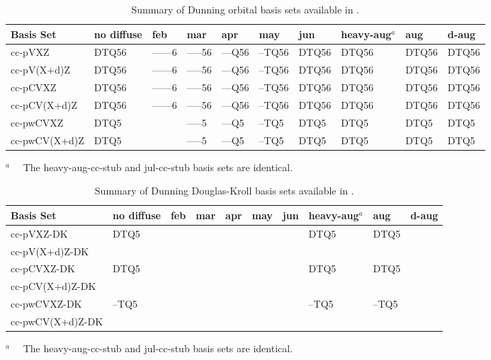\begin{table}[!htbp]
\begin{footnotesize}
\caption{Summary of Dunning orbital basis sets available in \PSIfour.} \label{table:basisDunningOrbital}
\parsep 10pt
\begin{center}
\begin{tabular}{llllllllll} 
\hline\hline
Basis Set            & no diffuse & feb & mar & apr & may & jun & heavy-aug$^a$ & aug & d-aug \\
\hline
cc-pVXZ              & DTQ56 & --{}--{}--{}--6 & --{}--{}--56 & --{}--Q56 & --TQ56 & DTQ56 & DTQ56 & DTQ56 & DTQ56 \\
cc-pV(X+d)Z          & DTQ56 & --{}--{}--{}--6 & --{}--{}--56 & --{}--Q56 & --TQ56 & DTQ56 & DTQ56 & DTQ56 & DTQ56 \\
cc-pCVXZ             & DTQ56 & --{}--{}--{}--6 & --{}--{}--56 & --{}--Q56 & --TQ56 & DTQ56 & DTQ56 & DTQ56 & DTQ56 \\
cc-pCV(X+d)Z         & DTQ56 & --{}--{}--{}--6 & --{}--{}--56 & --{}--Q56 & --TQ56 & DTQ56 & DTQ56 & DTQ56 & DTQ56 \\
cc-pwCVXZ            & DTQ5  &                 & --{}--{}--5  & --{}--Q5  & --TQ5  & DTQ5  & DTQ5  & DTQ5  & DTQ5  \\
cc-pwCV(X+d)Z        & DTQ5  &                 & --{}--{}--5  & --{}--Q5  & --TQ5  & DTQ5  & DTQ5  & DTQ5  & DTQ5  \\
\hline\hline
\end{tabular}
\end{center}
$^a\quad$ The heavy-aug-cc-stub and jul-cc-stub basis sets are identical.
\end{footnotesize}
\end{table}


\begin{table}[!htbp]
\begin{footnotesize}
\caption{Summary of Dunning Douglas-Kroll basis sets available in \PSIfour.} \label{table:basisDunningDK}
\parsep 10pt
\begin{center}
\begin{tabular}{llllllllll}
\hline\hline
Basis Set            & no diffuse & feb & mar & apr & may & jun & heavy-aug$^a$ & aug & d-aug \\
\hline
cc-pVXZ-DK           & DTQ5  &  &  &  &  &  & DTQ5  & DTQ5  &  \\
cc-pV(X+d)Z-DK       \\
cc-pCVXZ-DK          & DTQ5  &  &  &  &  &  & DTQ5  & DTQ5  &  \\
cc-pCV(X+d)Z-DK      \\
cc-pwCVXZ-DK         & --TQ5 &  &  &  &  &  & --TQ5 & --TQ5 &  \\
cc-pwCV(X+d)Z-DK     \\
\hline\hline
\end{tabular}
\end{center}
$^a\quad$ The heavy-aug-cc-stub and jul-cc-stub basis sets are identical.
\end{footnotesize}
\end{table}



